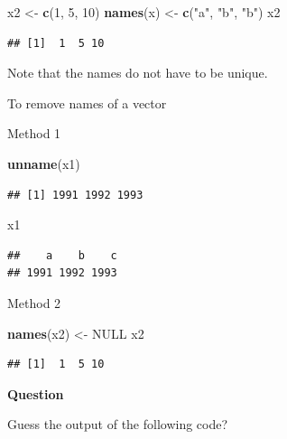 \documentclass[]{book}
\newenvironment{Shaded}{\begin{snugshade}}{\end{snugshade}}
\newcommand{\DecValTok}[1]{\textcolor[rgb]{0.00,0.00,0.81}{#1}}
\newcommand{\KeywordTok}[1]{\textcolor[rgb]{0.13,0.29,0.53}{\textbf{#1}}}
\newcommand{\NormalTok}[1]{#1}
\newcommand{\OtherTok}[1]{\textcolor[rgb]{0.56,0.35,0.01}{#1}}
\newcommand{\StringTok}[1]{\textcolor[rgb]{0.31,0.60,0.02}{#1}}
\begin{document}
\begin{Shaded}
\begin{Highlighting}[]
\NormalTok{x2 <-}\StringTok{ }\KeywordTok{c}\NormalTok{(}\DecValTok{1}\NormalTok{, }\DecValTok{5}\NormalTok{, }\DecValTok{10}\NormalTok{)}
\KeywordTok{names}\NormalTok{(x) <-}\StringTok{ }\KeywordTok{c}\NormalTok{(}\StringTok{"a"}\NormalTok{, }\StringTok{"b"}\NormalTok{, }\StringTok{"b"}\NormalTok{)}
\NormalTok{x2}
\end{Highlighting}
\end{Shaded}

\begin{verbatim}
## [1]  1  5 10
\end{verbatim}

Note that the names do not have to be unique.

To remove names of a vector

Method 1

\begin{Shaded}
\begin{Highlighting}[]
\KeywordTok{unname}\NormalTok{(x1)}
\end{Highlighting}
\end{Shaded}

\begin{verbatim}
## [1] 1991 1992 1993
\end{verbatim}

\begin{Shaded}
\begin{Highlighting}[]
\NormalTok{x1}
\end{Highlighting}
\end{Shaded}

\begin{verbatim}
##    a    b    c 
## 1991 1992 1993
\end{verbatim}

Method 2

\begin{Shaded}
\begin{Highlighting}[]
\KeywordTok{names}\NormalTok{(x2) <-}\StringTok{ }\OtherTok{NULL}
\NormalTok{x2}
\end{Highlighting}
\end{Shaded}

\begin{verbatim}
## [1]  1  5 10
\end{verbatim}

\textbf{Question}

Guess the output of the following code?
\end{document}
